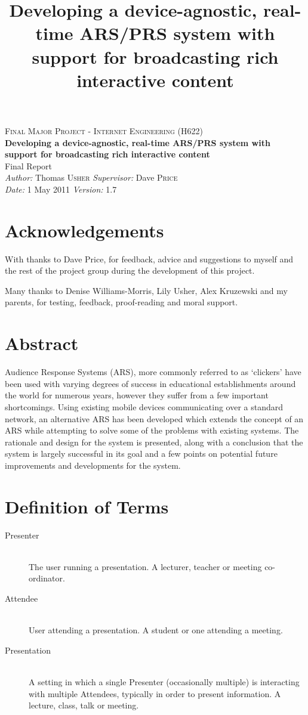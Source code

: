 \documentclass[a4papert,11pt,notitlepage]{article}
\title{Developing a device-agnostic, real-time ARS/PRS system with support for
broadcasting rich interactive content}
\begin{document}
\vspace*{\fill}
\begin{center}
\textsc{\Large Final Major Project - Internet Engineering (H622)}\\[0.3cm]
{\Large \bfseries Developing a device-agnostic, real-time ARS/PRS system with support for
broadcasting rich interactive content}\\[0.3cm]
{\Large Final Report}\\[0.3cm]
\emph{Author:} Thomas \textsc{Usher} \hspace{1cm} \emph{Supervisor:} Dave \textsc{Price}\\
\emph{Date:} 1 May 2011 \hspace{1cm} \emph{Version:} 1.7
\end{center}
\vspace*{\fill}
\pagebreak

\section*{Acknowledgements}
With thanks to Dave Price, for feedback, advice and suggestions to myself and the rest of the project group during the development of this project.

Many thanks to Denise Williams-Morris, Lily Usher, Alex Kruzewski and my parents, for testing, feedback, proof-reading and moral support.

\pagebreak

\section*{Abstract}
Audience Response Systems (ARS), more commonly referred to as `clickers' have been used with varying degrees of success in educational establishments around the world for numerous years, however they suffer from a few important shortcomings. Using existing mobile devices communicating over a standard network, an alternative ARS has been developed which extends the concept of an ARS while attempting to solve some of the problems with existing systems. The rationale and design for the system is presented, along with a conclusion that the system is largely successful in its goal and a few points on potential future improvements and developments for the system.

\section*{Definition of Terms}
\begin{description}
\item[Presenter] \hfill \\
The user running a presentation. A lecturer, teacher or meeting co-ordinator.
\item[Attendee] \hfill \\
User attending a presentation. A student or one attending a meeting.
\item[Presentation] \hfill \\
A setting in which a single Presenter (occasionally multiple) is interacting with multiple Attendees, typically in order to present information. A lecture, class, talk or meeting.
\end{description}
\end{document}
